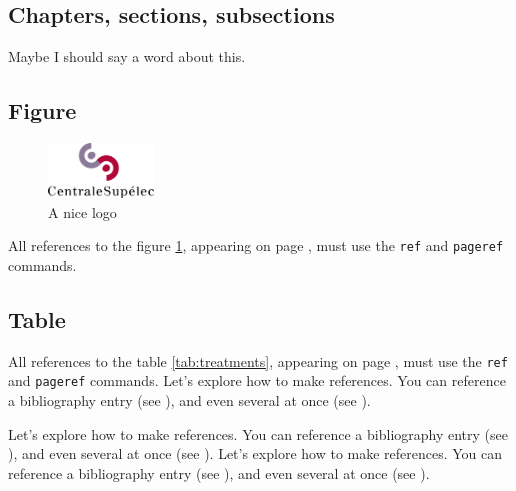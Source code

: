 \subsection{Chapters, sections, subsections}

Maybe I should say a word about this.

\subsection{Figure}

\begin{figure}[h]
    \centering
    \includegraphics[width=0.25\textwidth]{figures/entity_logo_1.png}
    \caption{A nice logo}
    \label{fig:cs_logo}
\end{figure}

All references to the figure \ref{fig:cs_logo}, appearing on page
\pageref{fig:cs_logo}, must use the \texttt{ref} and \texttt{pageref} commands.

\subsection{Table}


All references to the table \ref{tab:treatments}, appearing on page
\pageref{tab:treatments}, must use the \texttt{ref} and \texttt{pageref} commands.
Let's explore how to make references. You can reference a bibliography entry
(see \cite{einstein}), and even several at once (see \cite{dirac, knuthwebsite}).

Let's explore how to make references. You can reference a bibliography entry
(see \cite{einstein}), and even several at once (see \cite{dirac, knuthwebsite}).
Let's explore how to make references. You can reference a bibliography entry
(see \cite{einstein}), and even several at once (see \cite{dirac, knuthwebsite}).


